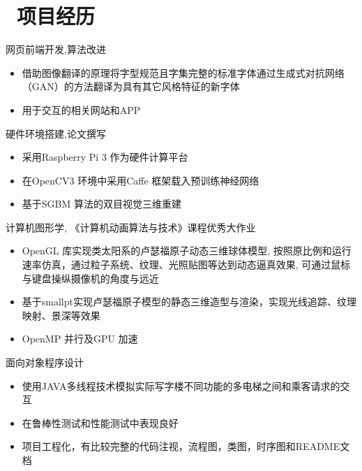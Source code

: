 \documentclass{resume}
\begin{document}
\section{\faUsers\ 项目经历}

\begin{onehalfspacing}
网页前端开发,算法改进
\begin{itemize}
  \item 借助图像翻译的原理将字型规范且字集完整的标准字体通过生成式对抗网络（GAN）的方法翻译为具有其它风格特征的新字体
  \item 用于交互的相关网站和APP
\end{itemize}
\end{onehalfspacing}

\begin{onehalfspacing}
硬件环境搭建,论文撰写
\begin{itemize}
  \item 采用Raspberry Pi 3 作为硬件计算平台
  \item 在OpenCV3 环境中采用Caffe 框架载入预训练神经网络 
  \item 基于SGBM 算法的双目视觉三维重建
\end{itemize}
\end{onehalfspacing}

\begin{onehalfspacing}
计算机图形学, 《计算机动画算法与技术》课程优秀大作业
\begin{itemize}
  \item OpenGL 库实现类太阳系的卢瑟福原子动态三维球体模型, 按照原比例和运行速率仿真，通过粒子系统、纹理、光照贴图等达到动态逼真效果, 可通过鼠标与键盘操纵摄像机的角度与远近
  \item 基于smallpt实现卢瑟福原子模型的静态三维造型与渲染，实现光线追踪、纹理映射、景深等效果
  \item OpenMP 并行及GPU 加速
\end{itemize}
\end{onehalfspacing}

\begin{onehalfspacing}
面向对象程序设计
\begin{itemize}
  \item 使用JAVA多线程技术模拟实际写字楼不同功能的多电梯之间和乘客请求的交互
  \item 在鲁棒性测试和性能测试中表现良好
  \item 项目工程化，有比较完整的代码注视，流程图，类图，时序图和README文档
\end{itemize}
\end{onehalfspacing}
\end{document}
